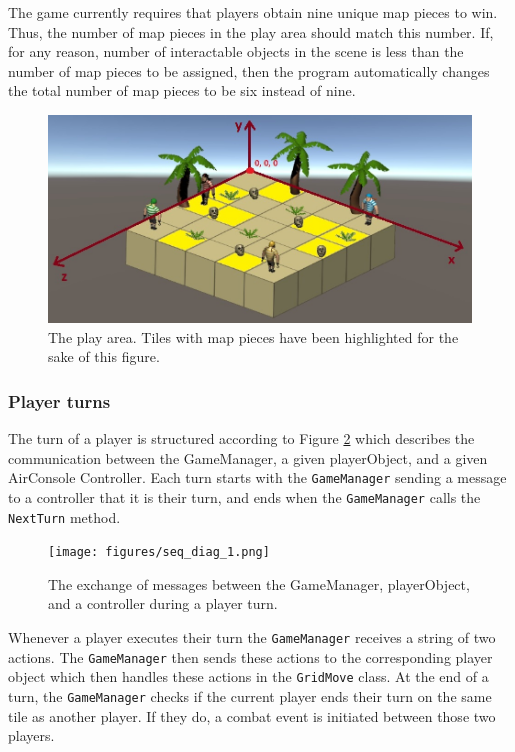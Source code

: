 The game currently requires that players obtain nine unique map pieces to win. Thus, the number of map pieces in the play area should match this number. If, for any reason, number of interactable objects in the scene is less than the number of map pieces to be assigned, then the program automatically changes the total number of map pieces to be six instead of nine.

\begin{figure}
	\centering
	\includegraphics[width=1\textwidth]{figures/mapFigure.jpg}
	\caption{The play area. Tiles with map pieces have been highlighted for the sake of this figure.\label{fig:playArea}}
\end{figure}

\subsubsection{Player turns}\label{•}
The turn of a player is structured according to Figure \ref{fig:seqDiagram1} which describes the communication between the GameManager, a given playerObject, and a given AirConsole Controller. Each turn starts with the \texttt{GameManager} sending a message to a controller that it is their turn, and ends when the \texttt{GameManager} calls the \texttt{NextTurn} method. 

\begin{figure}
	\centering	
	\texttt{[image: figures/seq\_diag\_1.png]}
	\caption{The exchange of messages between the GameManager, playerObject, and a controller during a player turn.\label{fig:seqDiagram1}}
\end{figure}

Whenever a player executes their turn the \texttt{GameManager} receives a string of two actions. The \texttt{GameManager} then sends these actions to the corresponding player object which then handles these actions in the \texttt{GridMove} class. At the end of a turn, the \texttt{GameManager} checks if the current player ends their turn on the same tile as another player. If they do, a combat event is initiated between those two players.


